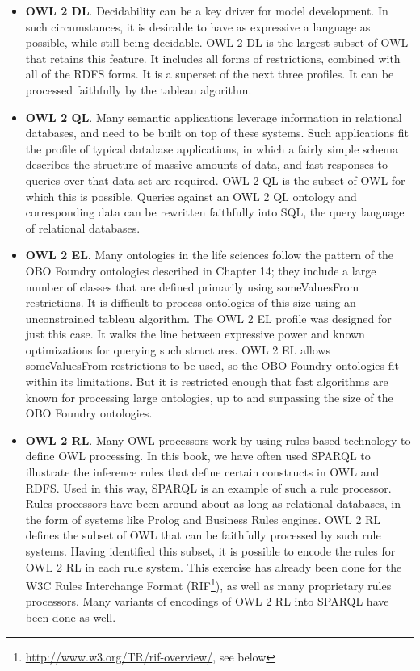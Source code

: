 \begin{itemize}
\item \textbf{OWL 2 DL}. Decidability can be a key driver for model development. In
such circumstances, it is desirable to have as expressive a language as
possible, while still being decidable. OWL 2 DL is the largest subset of
OWL that retains this feature. It includes all forms of restrictions,
combined with all of the RDFS forms. It is a superset of the next three
profiles. It can be processed faithfully by the tableau algorithm.

\item \textbf{OWL 2 QL}. Many semantic applications leverage information in relational
databases, and need to be built on top of these systems. Such
applications fit the profile of typical database applications, in which
a fairly simple schema describes the structure of massive amounts of
data, and fast responses to queries over that data set are required. OWL
2 QL is the subset of OWL for which this is possible. Queries against an
OWL 2 QL ontology and corresponding data can be rewritten faithfully
into SQL, the query language of relational databases.

\item \textbf{OWL 2 EL}. Many ontologies in the life sciences follow the pattern of the
OBO Foundry ontologies described in Chapter 14; they include a large
number of classes that are defined primarily using someValuesFrom
restrictions. It is difficult to process ontologies of this size using
an unconstrained tableau algorithm. The OWL 2 EL profile was designed
for just this case. It walks the line between expressive power and known
optimizations for querying such structures. OWL 2 EL allows
someValuesFrom restrictions to be used, so the OBO Foundry ontologies
fit within its limitations. But it is restricted enough that fast
algorithms are known for processing large ontologies, up to and
surpassing the size of the OBO Foundry ontologies.

\item \textbf{OWL 2 RL}. Many OWL processors work by using rules-based technology to
define OWL processing. In this book, we have often used SPARQL to
illustrate the inference rules that define certain constructs in OWL and
RDFS. Used in this way, SPARQL is an example of such a rule processor.
Rules processors have been around about as long as relational databases,
in the form of systems like Prolog and Business Rules engines. OWL 2 RL
defines the subset of OWL that can be faithfully processed by such rule
systems. Having identified this subset, it is possible to encode the
rules for OWL 2 RL in each rule system. This exercise has already been
done for the W3C Rules Interchange Format (RIF\footnote{\url{http://www.w3.org/TR/rif-overview/}, see below}), as well as
many proprietary rules processors. Many variants of encodings of OWL 2
RL into SPARQL have been done as well.
\end{itemize}



